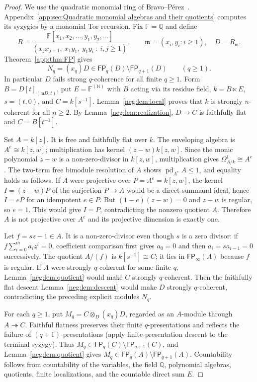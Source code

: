 \documentclass[11pt]{article}
\numberwithin{equation}{section}
\theoremstyle{definition}
\theoremstyle{remark}
\newcommand{\FP}{\mathsf{FP}}
\begin{document}
\begin{proof}
We use the quadratic monomial ring of Bravo--P\'erez~\cite[Example~1.3]{BravoPerez}.
Appendix~\ref{app:sec:Quadratic monomial algebras and their quotients}
computes its syzygies by a monomial Tor recursion.
Fix $\mathbb F=\mathbb Q$ and define
\[
R=\frac{\mathbb F[x_1,x_2,\ldots,y_1,y_2,\ldots]}
{(x_jx_{j+1},\ x_1y_1,\ y_1y_i\ :\ i,j\ge1)},
\qquad \mathfrak m=(x_i,y_i:i\ge1),\quad D=R_{\mathfrak m}.
\]
Theorem~\ref{app:thm:FP} gives
\[
N_q=(x_q)D\in\FP_q(D)\setminus\FP_{q+1}(D)
\qquad(q\ge1).
\]
In particular $D$ fails strong $q$-coherence for all finite $q\ge1$.
Form $B=D[t]_{(\mathfrak m D,t)}$, put
$E=\mathbb F^{(\mathbb N)}$ with $B$ acting via its residue field,
$k=B\ltimes E$, $s=(t,0)$, and $C=k[s^{-1}]$.
Lemma~\ref{neg:lem:local} proves that $k$ is strongly $n$-coherent
for all $n\ge2$.  By Lemma~\ref{neg:lem:realization},
$D\to C$ is faithfully flat and $C=B[t^{-1}]$.

Set $A=k[z]$.  It is free and faithfully flat over $k$.
The enveloping algebra is $A^e\cong k[z,w]$; multiplication has kernel
$(z-w)k[z,w]$.  Since the monic polynomial $z-w$ is a non-zero-divisor
in $k[z,w]$, multiplication gives
$\Omega^1_{A/k}\cong A^e$.  The two-term free bimodule resolution
of $A$ shows $\operatorname{pd}_{A^e}A\le1$, and equality holds as follows.  If $A$ were projective over
$P=A^e=k[z,w]$, the kernel $I=(z-w)P$ of the surjection $P\to A$
would be a direct-summand ideal, hence $I=eP$ for an idempotent
$e\in P$.  But $(1-e)(z-w)=0$ and $z-w$ is regular, so $e=1$.
This would give $I=P$, contradicting the nonzero quotient $A$.
Therefore $A$ is not projective over $A^e$ and its projective
dimension is exactly one.

Let $f=sz-1\in A$.  It is a non-zero-divisor even though $s$ is a
zero divisor: if $f\sum_{i=0}^m a_iz^i=0$, coefficient comparison
first gives $a_0=0$ and then $a_i=sa_{i-1}=0$ successively.
The quotient $A/(f)$ is $k[s^{-1}]\cong C$; it lies in
$\FP_\infty(A)$ because $f$ is regular.
If $A$ were strongly $q$-coherent for some finite $q$,
Lemma~\ref{neg:lem:quotient} would make $C$ strongly
$q$-coherent.  Then the faithfully flat descent
Lemma~\ref{neg:lem:descent} would make $D$ strongly
$q$-coherent, contradicting the preceding explicit modules $N_q$.

For each $q\ge1$, put
$M_q=C\otimes_D(x_q)D$, regarded as an $A$-module through
$A\twoheadrightarrow C$.  Faithful flatness preserves their
finite $q$-presentations and reflects the failure of
$(q+1)$-presentations (apply finite-presentation descent to the
terminal syzygy).  Thus
$M_q\in\FP_q(C)\setminus\FP_{q+1}(C)$, and
Lemma~\ref{neg:lem:quotient} gives
$M_q\in\FP_q(A)\setminus\FP_{q+1}(A)$.
Countability follows from countability of the variables, the field
$\mathbb Q$, polynomial algebras, quotients, finite localizations,
and the countable direct sum $E$.
\end{proof}
\end{document}
